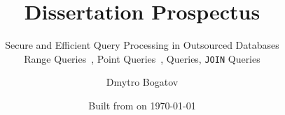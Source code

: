 \title{Dissertation Prospectus}

\subtitle{
	Secure and Efficient Query Processing in Outsourced Databases \\
	{\small Range Queries~\cite{ore-benchmark-17, epsolute}, Point Queries~\cite{epsolute}, \knn{} Queries, \texttt{JOIN} Queries}
}

\date{Built from \href{https://git.dbogatov.org/bu/proposal/presentation/commit/\version}{\emph{\version}} on \today}

\author{Dmytro Bogatov \\ }


\def\wm{\begin{tabular}{c} Dmytro Bogatov \\ Boston University \end{tabular}}
